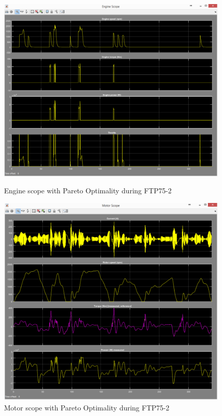 \begin{figure}[hp]
\centering
\includegraphics[scale=0.42]{figures/Pareto/FTP75-2/engine03Juli}
\caption{Engine scope with Pareto Optimality during FTP75-2}
\label{fig:epo2}
\includegraphics[scale=0.42]{figures/Pareto/FTP75-2/motor03Juli}
\caption{Motor scope with Pareto Optimality during FTP75-2}
\label{fig:mpo2}
\end{figure}

